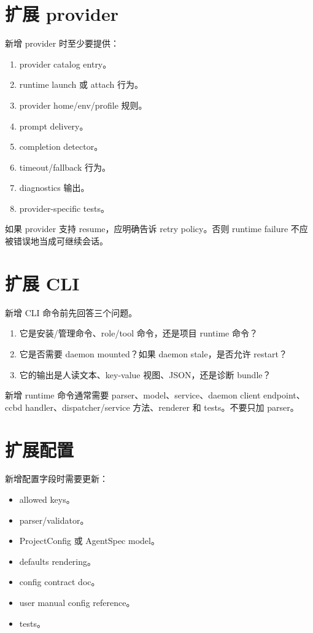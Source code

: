 \section{扩展 provider}

新增 provider 时至少要提供：

\begin{enumerate}
  \item provider catalog entry。
  \item runtime launch 或 attach 行为。
  \item provider home/env/profile 规则。
  \item prompt delivery。
  \item completion detector。
  \item timeout/fallback 行为。
  \item diagnostics 输出。
  \item provider-specific tests。
\end{enumerate}

如果 provider 支持 resume，应明确告诉 retry policy。否则 runtime failure 不应被错误地当成可继续会话。

\section{扩展 CLI}

新增 CLI 命令前先回答三个问题。

\begin{enumerate}
  \item 它是安装/管理命令、role/tool 命令，还是项目 runtime 命令？
  \item 它是否需要 daemon mounted？如果 daemon stale，是否允许 restart？
  \item 它的输出是人读文本、key-value 视图、JSON，还是诊断 bundle？
\end{enumerate}

新增 runtime 命令通常需要 parser、model、service、daemon client endpoint、ccbd handler、dispatcher/service 方法、renderer 和 tests。不要只加 parser。

\section{扩展配置}

新增配置字段时需要更新：

\begin{itemize}
  \item allowed keys。
  \item parser/validator。
  \item ProjectConfig 或 AgentSpec model。
  \item defaults rendering。
  \item config contract doc。
  \item user manual config reference。
  \item tests。
\end{itemize}

